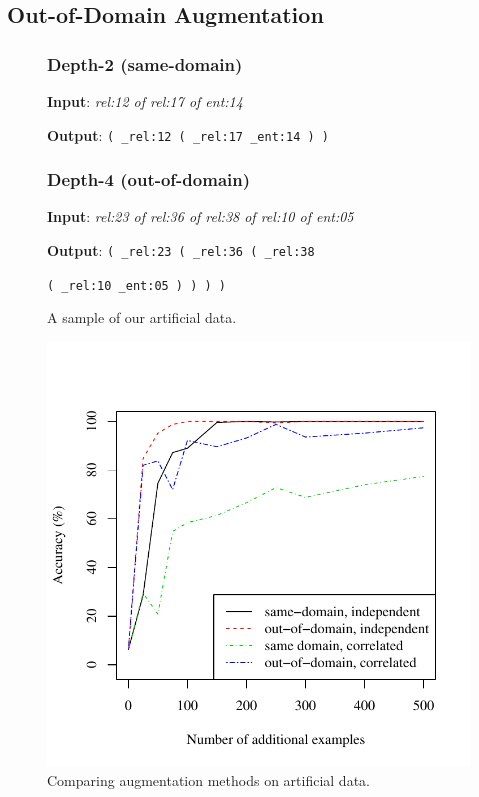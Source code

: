 \documentclass[11pt,letterpaper]{article}
\newcommand\nl[1]{\textit{#1}}
\begin{document}
\subsection{Out-of-Domain Augmentation}
\begin{figure}[t] 
\small
\begin{framed}
\footnotesize
\subsubsection*{Depth-2 (same-domain)}

\textbf{Input}: \nl{rel:12 of rel:17 of ent:14}

\textbf{Output}: \texttt{( \_rel:12 ( \_rel:17 \_ent:14 ) )}

\subsubsection*{Depth-4 (out-of-domain)}

\textbf{Input}: \nl{rel:23 of rel:36 of rel:38 of rel:10 of ent:05}

\textbf{Output}: \texttt{( \_rel:23 ( \_rel:36 ( \_rel:38}

\qquad \qquad \quad \texttt{( \_rel:10 \_ent:05 ) ) ) )}

\end{framed}
\caption{A sample of our artificial data.}
\label{fig:artificial-data}
\end{figure}

\begin{figure}[t] 
\small
\begin{center} 
  \includegraphics[scale=0.65]{fig-artificial-aug.pdf}
\end{center} 
\caption{Comparing augmentation methods on artificial data.}
\label{fig:artificial}
\end{figure}
\end{document}
